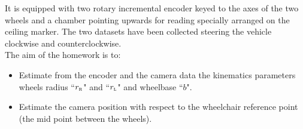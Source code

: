 It is equipped with two rotary incremental encoder keyed to the axes of the two wheels and a chamber pointing upwards for reading specially arranged on the ceiling marker.
The two datasets have been collected steering the vehicle clockwise and counterclockwise.
\\The aim of the homework is to:
\begin{itemize}
\item Estimate from the encoder and the camera data the kinematics parameters wheels radius “$r_\textsc{r}$" and “$r_\textsc{l}$" and wheelbase “$b$".
\item Estimate the camera position with respect to the wheelchair reference point (the mid point between the wheels).
\end{itemize}